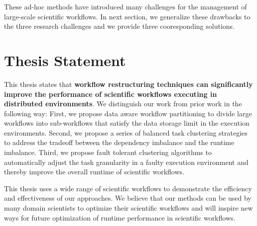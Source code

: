 These ad-hoc methods have introduced many challenges for the management of large-scale scientific workflows. In next section, we generalize these drawbacks to the three research challenges and we provide three cooresponding solutions. 

\section{Thesis Statement}
This thesis states that \textbf{workflow restructuring techniques can significantly improve the performance of scientific workflows executing in distributed environments}. We distinguish our work from prior work in the following way: First, we propose data aware workflow partitioning to divide large workflows into sub-workflows that satisfy the data storage limit in the execution environments. Second, we propose a series of balanced task clustering strategies to address the tradeoff between the dependency imbalance and the runtime imbalance. Third, we propose fault tolerant clustering algorithms to automatically adjust the task granularity in a faulty execution environment and thereby improve the overall runtime of scientific workflows. 

This thesis uses a wide range of scientific workflows to demonstrate the efficiency and effectiveness of our approaches. 
We believe that our methods can be used by many domain scientists to optimize their scientific workflows and will inspire new ways for future optimization of runtime performance in scientific workflows. 



